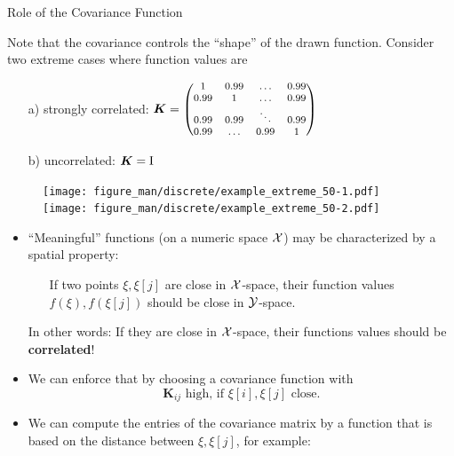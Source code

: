 \begin{vbframe}{Role of the Covariance Function}

Note that the covariance controls the \enquote{shape} of the drawn function. Consider two extreme cases where function values are

\begin{enumerate}
  \item[a)] strongly correlated: $\bm{K} = \begin{footnotesize}\begin{pmatrix} 1 & 0.99 & \dots & 0.99 \\
  0.99 & 1 & \dots & 0.99 \\
  0.99 & 0.99 & \ddots & 0.99 \\
  0.99 & \dots & 0.99 & 1 \end{pmatrix}\end{footnotesize}$
  \item[b)] uncorrelated: $\bm{K} = \mathrm{I}$
\end{enumerate}

\begin{figure}
  \texttt{[image: figure\_man/discrete/example\_extreme\_50-1.pdf]} ~~  \texttt{[image: figure\_man/discrete/example\_extreme\_50-2.pdf]}
\end{figure}


\framebreak 

\begin{itemize}
  \item \enquote{Meaningful} functions (on a numeric space $\mathcal{X}$) may be characterized by a spatial property: \vspace*{0.2cm}
  \begin{itemize}
    \item[] If two points $\xi, \xi[j]$ are close in $\mathcal{X}$-space, their function values $f(\xi), f(\xi[j])$ should be close in $\mathcal{Y}$-space. 
  \end{itemize} \vspace*{0.2cm}
  In other words: If they are close in $\mathcal{X}$-space, their functions values should be \textbf{correlated}! \vspace*{0.4cm}
  \item We can enforce that by choosing a covariance function with  
  $$
    \bm{K}_{ij} \text{ high, if } \xi[i], \xi[j] \text{ close.}
  $$

  \framebreak 

  \item We can compute the entries of the covariance matrix by a function that is based on the distance between $\xi, \xi[j]$, for example: 
  

\end{itemize}
\end{vbframe}
